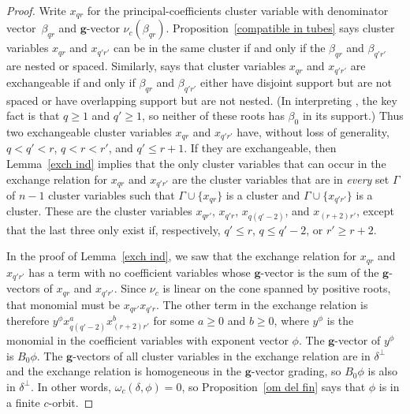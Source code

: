 \documentclass{amsart}
\theoremstyle{definition}
\theoremstyle{remark}
\numberwithin{equation}{section}
\newcommand{\set}[1]{{\lbrace #1 \rbrace}}
\newcommand{\0}{{\mathbf{0}}}
\newcommand{\g}{\mathbf{g}}
\begin{document}
\begin{proof}
Write $x_{qr}$ for the principal-coefficients cluster variable with denominator vector~$\beta_{qr}$ and $\g$-vector $\nu_c(\beta_{qr})$.
Proposition~\ref{compatible in tubes} says cluster variables $x_{qr}$ and $x_{q'r'}$ can be in the same cluster if and only if the $\beta_{qr}$ and $\beta_{q'r'}$ are nested or spaced.
Similarly, \cite[Theorem~7.2]{affdenom} says that cluster variables $x_{qr}$ and $x_{q'r'}$ are exchangeable if and only if $\beta_{qr}$ and $\beta_{q'r'}$ either have disjoint support but are not spaced or have overlapping support but are not nested.
(In interpreting \cite[Theorem~7.2]{affdenom}, the key fact is that $q\ge1$ and $q'\ge 1$, so neither of these roots has $\beta_0$ in its support.)
Thus two exchangeable cluster variables $x_{qr}$ and $x_{q'r'}$ have, without loss of generality, $q<q'<r$, $q<r<r'$, and $q'\le r+1$.
If they are exchangeable, then Lemma~\ref{exch ind} implies that the only cluster variables that can occur in the exchange relation for $x_{qr}$ and $x_{q'r'}$ are the cluster variables that are in \emph{every} set $\Gamma$ of $n-1$ cluster variables such that $\Gamma\cup\set{x_{qr}}$ is a cluster and $\Gamma\cup\set{x_{q'r'}}$ is a cluster.
These are the cluster variables $x_{qr'}$, $x_{q'r}$, $x_{q(q'-2)}$, and $x_{(r+2)r'}$, except that the last three only exist if, respectively, $q'\le r$, $q\le q'-2$, or $r'\ge r+2$.

In the proof of Lemma~\ref{exch ind}, we saw that the exchange relation for $x_{qr}$ and $x_{q'r'}$ has a term with no coefficient variables whose $\g$-vector is the sum of the $\g$-vectors of $x_{qr}$ and $x_{q'r'}$.
Since $\nu_c$ is linear on the cone spanned by positive roots, that monomial must be $x_{qr'}x_{q'r}$.
The other term in the exchange relation is therefore $y^\phi x_{q(q'-2)}^ax_{(r+2)r'}^b$ for some $a\ge0$ and $b\ge0$, where $y^\phi$ is the monomial in the coefficient variables with exponent vector $\phi$.
The $\g$-vector of $y^\phi$ is $B_0\phi$.
The $\g$-vectors of all cluster variables in the exchange relation are in $\delta^\perp$ and the exchange relation is homogeneous in the $\g$-vector grading, so $B_0\phi$ is also in $\delta^\perp$.
In other words, $\omega_c(\delta,\phi)=0$, so Proposition~\ref{om del fin} says that $\phi$ is in a finite $c$-orbit.


\end{proof}
\end{document}
